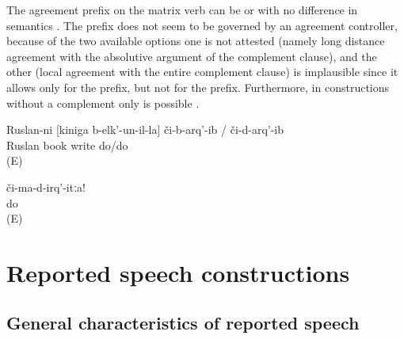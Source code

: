 The agreement prefix on the matrix verb can be  or  with no difference in semantics . The prefix does not seem to be governed by an agreement controller, because of the two available options one is not attested (namely long distance agreement with the absolutive argument of the complement clause), and the other (local agreement with the entire complement clause) is implausible since it allows only for the  prefix, but not for the  prefix. Furthermore, in constructions without a complement only  is possible .
%
\begin{exe}
	\ex	\label{ex:‎‎‎Ruslan pretended to write a book}
	\gll	Ruslan-ni	[kiniga	b-elk'-un-il-la]	či-b-arq'-ib	/	či-d-arq'-ib\\
		Ruslan	book	write	do\slash{}do\\
	\glt	{} (E)

	\ex	\label{ex:‎Do not pretend}
	\gll	či-ma-d-irq'-itːa!\\
		do\\
	\glt	{} (E)
\end{exe}







\section{Reported speech constructions}
\label{sec:Reported speech constructions}



\subsection{General characteristics of reported speech}
\label{ssec:General characteristics of reported speech}

